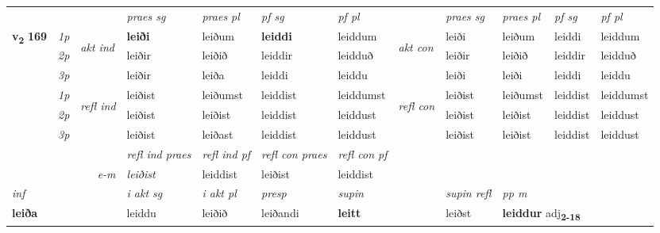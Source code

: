 \begin{longtable}[l]{X>{\footnotesize\itshape}llXXXXlXXXX}
\midrule

 & &   & \textit{praes sg}  & \textit{praes pl}    & \textit{ pf sg} & \textit{pf pl} & & \textit{praes sg}  & \textit{praes pl}    & \textit{pf sg} & \textit{pf pl }  \\ \cmidrule{4-7} \cmidrule{9-12}
 \multirow{2}{*}{{{\textbf{v{\textsubscript{2}}} \Large{\textbf{169}}}}}  & 1p & \multirow{3}{*}{\begin{turn}{90}\textit{akt ind}\end{turn}} & \textbf{leiði} & leiðum & \textbf{leiddi} & leiddum & \multirow{3}{*}{\begin{turn}{90}\textit{akt con}\end{turn}} &leiði & leiðum & leiddi & leiddum\\*
 & 2p &  &  leiðir  & leiðið & leiddir & leidduð & & leiðir & leiðið & leiddir & leidduð \\*
 & 3p &  & leiðir & leiða & leiddi & leiddu & & leiði & leiði& leiddi & leiddu \\*
\cmidrule{4-7} \cmidrule{9-12}
 & 1p & \multirow{3}{*}{\begin{turn}{90}\textit{refl ind}\end{turn}}  & leiðist & leiðumst & leiddist & leiddumst & \multirow{3}{*}{\begin{turn}{90}\textit{refl con}\end{turn}}  &leiðist & leiðumst & leiddist & leiddumst \\*
 & 2p &  & leiðist & leiðist & leiddist & leiddust & &leiðist & leiðist & leiddist & leiddust \\*
 & 3p  & & leiðist & leiðast & leiddist & leiddust & & leiðist & leiðist& leiddist & leiddust \\*
\cmidrule{4-7} \cmidrule{9-12}

 & && \textit{refl ind praes} & \textit{refl ind pf} & \textit{refl con praes} & \textit{refl con pf} \\*
\multicolumn{3}{r}{\textit{e-m}}& leiðist & leiddist & leiðist & leiddist \\*

\cmidrule{4-7}
   {\textit{inf}} & &  & \textit{i akt sg} & \textit{i akt pl}   & \textit{presp} & \textit{supin} && \textit{supin refl} & \textit{pp m} \\*
  {\textbf{leiða}} & && leiddu  & leiðið   & leiðandi &  \textbf{leitt} && leiðst & \multicolumn{2}{l}{\textbf{leiddur} adj\textbf{\textsubscript{2-18}}} \\*

\midrule


\end{longtable}
